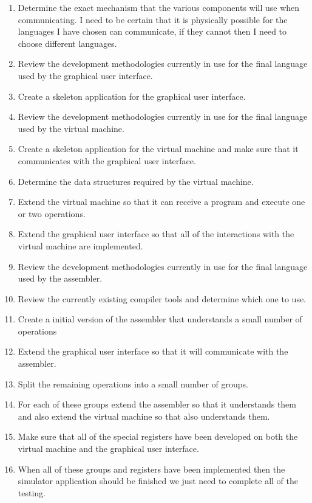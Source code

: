 \documentclass[11pt]{article} %
\begin{document}
\begin{enumerate}
	\item Determine the exact mechanism that the various components will use when communicating. I need to be certain that it is physically possible for the languages I have chosen can communicate, if they cannot then I need to choose different languages.
	\item Review the development methodologies currently in use for the final language used by the graphical user interface.
	\item Create a skeleton application for the graphical user interface.
	\item Review the development methodologies currently in use for the final language used by the virtual machine.
	\item Create a skeleton application for the virtual machine and make sure that it communicates with the graphical user interface.
	\item Determine the data structures required by the virtual machine.
	\item Extend the virtual machine so that it can receive a program and execute one or two operations.
	\item Extend the graphical user interface so that all of the interactions with the virtual machine are implemented.
	\item Review the development methodologies currently in use for the final language used by the assembler.
	\item Review the currently existing compiler tools and determine which one to use.
	\item Create a initial version of the assembler that understands a small number of operations
	\item Extend the graphical user interface so that it will communicate with the assembler.
	\item Split the remaining operations into a small number of groups.
	\item For each of these groups extend the assembler so that it understands them and also extend the virtual machine so that also understands them.
	\item Make sure that all of the special registers have been developed on both the virtual machine and the graphical user interface.
	\item When all of these groups and registers have been implemented then the simulator application should be finished we just need to complete all of the testing. 
\end{enumerate}
\end{document}
